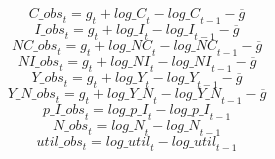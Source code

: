 \begin{dmath}
{C\_obs}_{t}={{g}}_{t}+{log\_C}_{t}-{log\_C}_{t-1}-{{\overline{g}}}
\end{dmath}
\begin{dmath}
{I\_obs}_{t}={{g}}_{t}+{log\_I}_{t}-{log\_I}_{t-1}-{{\overline{g}}}
\end{dmath}
\begin{dmath}
{NC\_obs}_{t}={{g}}_{t}+{log\_NC}_{t}-{log\_NC}_{t-1}-{{\overline{g}}}
\end{dmath}
\begin{dmath}
{NI\_obs}_{t}={{g}}_{t}+{log\_NI}_{t}-{log\_NI}_{t-1}-{{\overline{g}}}
\end{dmath}
\begin{dmath}
{Y\_obs}_{t}={{g}}_{t}+{log\_Y}_{t}-{log\_Y}_{t-1}-{{\overline{g}}}
\end{dmath}
\begin{dmath}
{Y\_N\_obs}_{t}={{g}}_{t}+{log\_Y\_N}_{t}-{log\_Y\_N}_{t-1}-{{\overline{g}}}
\end{dmath}
\begin{dmath}
{p\_I\_obs}_{t}={log\_p\_I}_{t}-{log\_p\_I}_{t-1}
\end{dmath}
\begin{dmath}
{N\_obs}_{t}={log\_N}_{t}-{log\_N}_{t-1}
\end{dmath}
\begin{dmath}
{util\_obs}_{t}={log\_util}_{t}-{log\_util}_{t-1}
\end{dmath}
